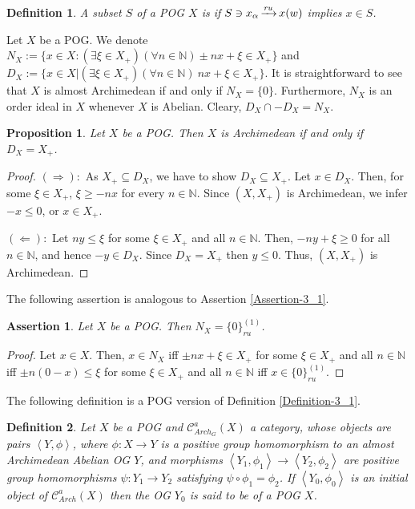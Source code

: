 \documentclass[10pt]{article}
\newtheorem{proposition}{Proposition}[section]
\newtheorem{assertion}{Assertion}[section]
\newtheorem{definition}{Definition}[section]
\DeclareMathOperator{\convr}{\xrightarrow[]{{\it ru}}}
\renewcommand{\a}{\alpha}
\begin{document}
\begin{definition}\label{Definition-5_3}
A subset $S$ of a POG $X$ is {\color{blue}{ru-closed}} if $S\ni x_{\a}\convr x(w)$ implies $x\in S$.
\end{definition}

\noindent
Let $X$ be a POG. We denote $N_X:=\bigl\{x\in X: (\exists\xi\in X_+)(\forall n\in\mathbb{N})\pm nx+\xi\in X_+\bigl\}$
and $D_X:=\{x\in X|(\exists\xi\in X_+)(\forall n\in\mathbb{N})\ nx+\xi\in X_+\}$.
It is straightforward to see that $X$ is almost Archimedean if and only if $N_X=\{0\}$.
Furthermore, $N_X$ is an order ideal in $X$ whenever $X$ is Abelian.  Cleary, $D_X\cap-D_X=N_X$.

\begin{proposition}\label{Proposition-5_1}
Let $X$ be a POG. Then $X$ is Archimedean if and only if $D_X=X_+$.
\end{proposition}

\begin{proof}
$(\Longrightarrow)$:\ 
As $X_+\subseteq D_X$, we have to show $D_X\subseteq X_+$.
Let $x\in D_X$. Then, for some $\xi\in X_+$, $\xi\geqslant -nx$ for every $n\in\mathbb{N}$.
Since $(X,X_+)$ is Archimedean, we infer $-x\leqslant 0$, or $x\in X_+$.

\smallskip
$(\Longleftarrow)$:\ 
Let $ny\leqslant\xi$ for some $\xi\in X_+$ and all $n\in\mathbb{N}$.
Then, $-ny+\xi\geqslant 0$ for all $n\in\mathbb{N}$, and hence $-y\in D_X$. Since $D_X=X_+$ then $y\leqslant 0$. Thus, $(X,X_+)$ is Archimedean.
\end{proof}

The following assertion is analogous to Assertion \ref{Assertion-3_1}.

\begin{assertion}\label{Assertion-5_1}
Let $X$ be a POG. Then $N_X=\{0\}^{(1)}_{ru}$.
\end{assertion}

\begin{proof}
Let $x\in X$. Then, $x\in N_X$ iff $\pm nx+\xi\in X_+$ for some $\xi\in X_+$ and all $n\in\mathbb{N}$ iff
$\pm n(0-x)\leqslant\xi$ for some $\xi\in X_+$ and all $n\in\mathbb{N}$ iff $x\in\{0\}^{(1)}_{ru}$.
\end{proof}

\medskip
The following definition is a POG version of Definition \ref{Definition-3_1}.

\begin{definition}\label{Definition-5_4}
Let $X$ be a POG and $\mathcal{C}^a_{Arch_G}(X)$ a category, whose objects are pairs $\left\langle Y,\phi\right\rangle$,
where $\phi:X\to Y$ is a positive group homomorphism to an almost Archimedean Abelian OG $Y$, and morphisms
$\left\langle Y_1,\phi_1\right\rangle\to\left\langle Y_2,\phi_2\right\rangle$ are positive group homomorphisms $\psi: Y_1\to Y_2$ satisfying
$\psi\circ\phi_1=\phi_2$. If $\left\langle Y_0,\phi_0\right\rangle$ is an initial object of $\mathcal{C}^a_{Arch}(X)$ 
then the OG $Y_0$ is said to be {\color{blue}{almost Archimedeanization}} of a POG $X$.
\end{definition}
\end{document}
